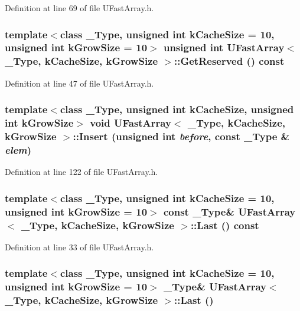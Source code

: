 Definition at line 69 of file UFastArray.h.\hypertarget{class_u_fast_array_19b5d66abeea2c7288423ff604348e57}{
\subsubsection[{GetReserved}]{\setlength{\rightskip}{0pt plus 5cm}template$<$class \_\-Type, unsigned int kCacheSize = 10, unsigned int kGrowSize = 10$>$ unsigned int {\bf UFastArray}$<$ \_\-Type, kCacheSize, kGrowSize $>$::GetReserved () const}}
\label{class_u_fast_array_19b5d66abeea2c7288423ff604348e57}




Definition at line 47 of file UFastArray.h.\hypertarget{class_u_fast_array_ff7420c215117e8cdc91d27fd2519b13}{
\subsubsection[{Insert}]{\setlength{\rightskip}{0pt plus 5cm}template$<$class \_\-Type, unsigned int kCacheSize, unsigned int kGrowSize$>$ void {\bf UFastArray}$<$ \_\-Type, kCacheSize, kGrowSize $>$::Insert (unsigned int {\em before}, \/  const \_\-Type \& {\em elem})}}
\label{class_u_fast_array_ff7420c215117e8cdc91d27fd2519b13}




Definition at line 122 of file UFastArray.h.\hypertarget{class_u_fast_array_a6ab8002f344c6faab090a89375b10f9}{
\subsubsection[{Last}]{\setlength{\rightskip}{0pt plus 5cm}template$<$class \_\-Type, unsigned int kCacheSize = 10, unsigned int kGrowSize = 10$>$ const \_\-Type\& {\bf UFastArray}$<$ \_\-Type, kCacheSize, kGrowSize $>$::Last () const}}
\label{class_u_fast_array_a6ab8002f344c6faab090a89375b10f9}




Definition at line 33 of file UFastArray.h.\hypertarget{class_u_fast_array_6a006a084269457b6033e624999adc1c}{
\subsubsection[{Last}]{\setlength{\rightskip}{0pt plus 5cm}template$<$class \_\-Type, unsigned int kCacheSize = 10, unsigned int kGrowSize = 10$>$ \_\-Type\& {\bf UFastArray}$<$ \_\-Type, kCacheSize, kGrowSize $>$::Last ()}}
\label{class_u_fast_array_6a006a084269457b6033e624999adc1c}




